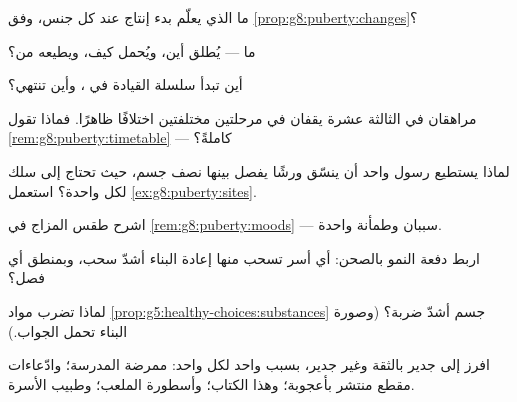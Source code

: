 \begin{exercise}[$\star$]\label{exo:g8:puberty:3}
ما الذي يعلّم بدء إنتاج  عند كل جنس، وفق
\cref{prop:g8:puberty:changes}؟
\end{exercise}

\begin{exercise}[$\star$]\label{exo:g8:puberty:4}
ما  --- يُطلق أين، ويُحمل كيف، ويطيعه من؟
\end{exercise}

\begin{exercise}[$\star$]\label{exo:g8:puberty:5}
أين تبدأ سلسلة القيادة في ، وأين تنتهي؟
\end{exercise}

\begin{exercise}[$\star$]\label{exo:g8:puberty:6}
مراهقان في الثالثة عشرة يقفان في مرحلتين مختلفتين اختلافًا ظاهرًا.
فماذا تقول \cref{rem:g8:puberty:timetable} --- كاملةً؟
\end{exercise}

\begin{exercise}[$\star\star$]\label{exo:g8:puberty:7}
لماذا يستطيع رسول واحد أن ينسّق ورشًا يفصل بينها نصف جسم، حيث
تحتاج  إلى سلك لكل واحدة؟ استعمل
\cref{ex:g8:puberty:sites}.
\end{exercise}

\begin{exercise}[$\star\star$]\label{exo:g8:puberty:8}
اشرح طقس المزاج في \cref{rem:g8:puberty:moods} --- سببان وطمأنة
واحدة.
\end{exercise}

\begin{exercise}[$\star\star$]\label{exo:g8:puberty:9}
اربط دفعة النمو بالصحن: أي أسر  تسحب منها إعادة البناء
أشدّ سحب، وبمنطق أي فصل؟
\end{exercise}

\begin{exercise}[$\star\star$]\label{exo:g8:puberty:10}
لماذا تضرب مواد \cref{prop:g5:healthy-choices:substances} جسم
 أشدّ ضربة؟ (وصورة البناء تحمل الجواب.)
\end{exercise}

\begin{exercise}[$\star\star$]\label{exo:g8:puberty:11}
افرز إلى جدير بالثقة وغير جدير، بسبب واحد لكل واحد: ممرضة المدرسة؛
وادّعاءات مقطع منتشر بأعجوبة؛ وهذا الكتاب؛ وأسطورة الملعب؛ وطبيب
الأسرة.
\end{exercise}

